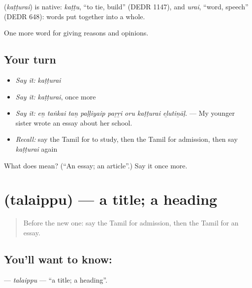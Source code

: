 \begin{cousinweb}
\textbf{} (\emph{kaṭṭurai}) is native: \emph{kaṭṭu}, \textquotedblleft{}to tie, build\textquotedblright{} (DEDR 1147), and \emph{urai}, \textquotedblleft{}word, speech\textquotedblright{} (DEDR 648): words put together into a whole.
\end{cousinweb}

\begin{grammarlens}[title={What you've built}]
One more word for giving reasons and opinions.
\end{grammarlens}

\subsection*{Your turn}
\begin{itemize}
\raggedright
  \item \emph{Say it:} \emph{kaṭṭurai}
  \item \emph{Say it:} \emph{kaṭṭurai}, once more
  \item \emph{Say it:} \emph{eṉ taṅkai taṉ paḷḷiyaip paṟṟi oru kaṭṭurai eḻutiṉāḷ.} — My younger sister wrote an essay about her school.
  \item \emph{Recall:} say the Tamil for to study, then the Tamil for admission, then say \emph{kaṭṭurai} again
\end{itemize}

\begin{tcolorbox}[breakable,colback=teal!4,colframe=teal!35!black,title={Before you move on}]
What does  mean? (\textquotedblleft{}An essay; an article\textquotedblright{}.) Say it once more.
\end{tcolorbox}
\section[\texorpdfstring{\ta{தலைப்பு} (talaippu)}{தலைப்பு (talaippu)}]{ (talaippu) — a title; a heading}

\label{lesson:TA-C365-talaippu}



\begin{quote}
Before the new one: say the Tamil for admission, then the Tamil for an essay.
\end{quote}

\subsection*{You'll want to know: }
\textbf{} — \emph{talaippu} — \textquotedblleft{}a title; a heading\textquotedblright{}.

